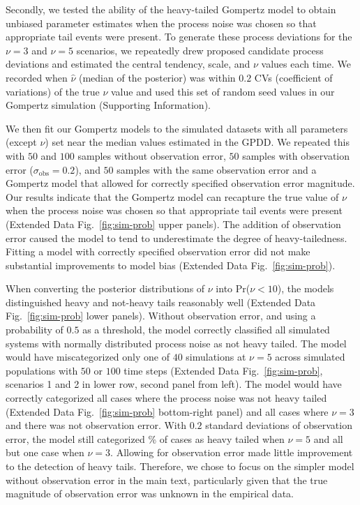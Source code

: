 Secondly, we tested the ability of the heavy-tailed Gompertz model to obtain unbiased parameter estimates when the process noise was chosen so that appropriate tail events were present. To generate these process deviations for the \(\nu = 3\) and \(\nu = 5\) scenarios, we repeatedly drew proposed candidate process deviations and estimated the central tendency, scale, and \(\nu\) values each time. We recorded when \(\hat{\nu}\) (median of the posterior) was within \(0.2\) CVs (coefficient of variations) of the true \(\nu\) value and used this set of random seed values in our Gompertz simulation (Supporting Information).

We then fit our Gompertz models to the simulated datasets with all parameters (except \(\nu\)) set near the median values estimated in the GPDD. We repeated this with \(50\) and \(100\) samples without observation error, \(50\) samples with observation error (\(\sigma_\mathrm{obs} = 0.2\)), and \(50\) samples with the same observation error and a Gompertz model that allowed for correctly specified observation error magnitude. Our results indicate that the Gompertz model can recapture the true value of \(\nu\) when the process noise was chosen so that appropriate tail events were present (Extended Data Fig.~\ref{fig:sim-prob} upper panels). The addition of observation error caused the model to tend to underestimate the degree of heavy-tailedness. Fitting a model with correctly specified observation error did not make substantial improvements to model bias (Extended Data Fig.~\ref{fig:sim-prob}).

When converting the posterior distributions of \(\nu\) into Pr(\(\nu < 10\)), the models distinguished heavy and not-heavy tails reasonably well (Extended Data Fig.~\ref{fig:sim-prob} lower panels). Without observation error, and using a probability of \(0.5\) as a threshold, the model correctly classified all simulated systems with normally distributed process noise as not heavy tailed. The model would have miscategorized only one of \(40\) simulations at \(\nu = 5\) across simulated populations with \(50\) or \(100\) time steps (Extended Data Fig.~\ref{fig:sim-prob}, scenarios 1 and 2 in lower row, second panel from left). The model would have correctly categorized all cases where the process noise was not heavy tailed (Extended Data Fig.~\ref{fig:sim-prob} bottom-right panel) and all cases where \(\nu = 3\) and there was not observation error. With \(0.2\) standard deviations of observation error, the model still categorized \obsErrorNuFivePerc\% of cases as heavy tailed when \(\nu = 5\) and all but one case when \(\nu = 3\). Allowing for observation error made little improvement to the detection of heavy tails. Therefore, we chose to focus on the simpler model without observation error in the main text, particularly given that the true magnitude of observation error was unknown in the empirical data.

